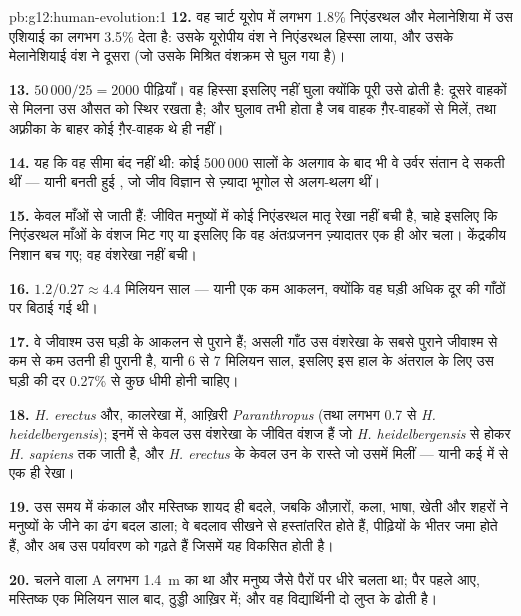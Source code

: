 \begin{solution}{pb:g12:human-evolution:1}
\textbf{12.} वह चार्ट यूरोप में लगभग 1.8\% निएंडरथल और मेलानेशिया में उस
एशियाई  का लगभग 3.5\%  देता है: उसके यूरोपीय वंश ने निएंडरथल हिस्सा
लाया, और उसके मेलानेशियाई वंश ने दूसरा (जो उसके मिश्रित वंशक्रम से घुल गया
है)।

\textbf{13.} $50\,000/25 = 2000$ पीढ़ियाँ। वह हिस्सा इसलिए नहीं घुला
क्योंकि पूरी  उसे ढोती है: दूसरे वाहकों से मिलना उस औसत को स्थिर रखता
है; और घुलाव तभी होता है जब वाहक ग़ैर-वाहकों से मिलें, तथा अफ़्रीका के बाहर
कोई ग़ैर-वाहक थे ही नहीं।

\textbf{14.} यह कि वह सीमा बंद नहीं थी: कोई 500\,000 सालों के अलगाव के बाद
भी वे  उर्वर संतान दे सकती थीं --- यानी बनती हुई , जो जीव
विज्ञान से ज़्यादा भूगोल से अलग-थलग थीं।

\textbf{15.}  केवल माँओं से जाती हैं: जीवित मनुष्यों में कोई
निएंडरथल मातृ रेखा नहीं बची है, चाहे इसलिए कि निएंडरथल माँओं के वंशज मिट गए
या इसलिए कि वह अंतःप्रजनन ज़्यादातर एक ही ओर चला। केंद्रकीय निशान बच गए; वह
वंशरेखा नहीं बची।

\textbf{16.} $1.2/0.27 \approx 4.4$ मिलियन साल --- यानी एक कम आकलन, क्योंकि
वह घड़ी अधिक दूर की गाँठों पर बिठाई गई थी।

\textbf{17.} वे जीवाश्म उस घड़ी के आकलन से पुराने हैं; असली गाँठ उस वंशरेखा
के सबसे पुराने जीवाश्म से कम से कम उतनी ही पुरानी है, यानी 6 से 7 मिलियन
साल, इसलिए इस हाल के अंतराल के लिए उस घड़ी की दर 0.27\% से कुछ धीमी होनी
चाहिए।

\textbf{18.} \emph{H. erectus} और, कालरेखा में, आख़िरी
\emph{Paranthropus} (तथा लगभग 0.7 से \emph{H. heidelbergensis});
इनमें से केवल उस वंशरेखा के जीवित वंशज हैं जो \emph{H. heidelbergensis} से
होकर \emph{H. sapiens} तक जाती है, और \emph{H. erectus} के केवल उन
 के रास्ते जो उसमें मिलीं --- यानी कई में से एक ही रेखा।

\textbf{19.} उस समय में कंकाल और मस्तिष्क शायद ही बदले, जबकि औज़ारों, कला,
भाषा, खेती और शहरों ने मनुष्यों के जीने का ढंग बदल डाला; वे बदलाव सीखने से
हस्तांतरित होते हैं, पीढ़ियों के भीतर जमा होते हैं, और अब उस पर्यावरण को
गढ़ते हैं जिसमें यह  विकसित होती है।

\textbf{20.} चलने वाला A लगभग \qty{1.4}{m} का था और मनुष्य जैसे पैरों पर
धीरे चलता था; पैर पहले आए, मस्तिष्क एक मिलियन साल बाद, ठुड्डी आख़िर में; और
वह विद्यार्थिनी दो लुप्त  के  ढोती है।
\end{solution}
